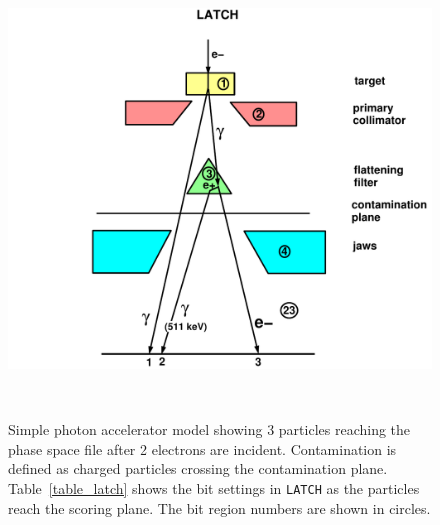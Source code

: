 \documentclass[12pt,twoside]{article}
\begin{document}
\begin{figure}[H]
\vspace*{-0.3cm}
\begin{center}
\leavevmode
\mbox{}\hspace{0cm}
\includegraphics[height=12cm]{figures/latch}
\caption[Example of LATCH settings.]
{Simple photon accelerator model showing 3 particles reaching
the phase space file after 2 electrons are incident.  Contamination is
defined as charged particles crossing the contamination plane.
Table~\ref{table_latch} shows the bit settings in {\tt LATCH} as the particles
reach the scoring plane. The bit region numbers are shown in circles.}
\label{fig_latch}
\end{center}
\end{figure}
\end{document}
